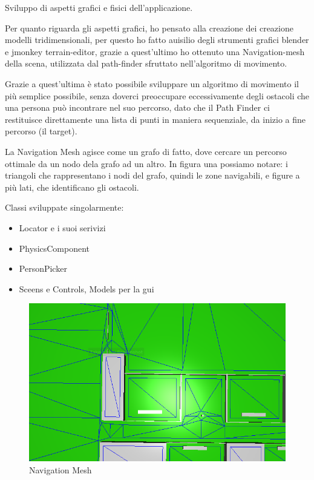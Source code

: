 Sviluppo di aspetti grafici e fisici dell'applicazione.

Per quanto riguarda gli aspetti grafici, ho pensato alla creazione dei creazione modelli tridimensionali, per questo ho fatto auisilio degli strumenti grafici blender e jmonkey terrain-editor, grazie a quest'ultimo ho ottenuto una Navigation-mesh della scena, utilizzata dal path-finder sfruttato nell'algoritmo di movimento.

Grazie a quest'ultima è stato possibile sviluppare un algoritmo di movimento il più semplice possibile, senza doverci preoccupare eccessivamente degli ostacoli che una persona può incontrare nel suo percorso,
dato che il Path Finder ci restituisce direttamente una lista di punti in maniera sequenziale, da inizio a fine percorso (il target).

La Navigation Mesh agisce come un grafo di fatto, dove cercare un percorso ottimale da un nodo dela grafo ad un altro.
In figura una possiamo notare: i triangoli che rappresentano i nodi del grafo, quindi le zone navigabili, e figure a più lati, che identificano gli ostacoli.

Classi sviluppate singolarmente:
\begin{itemize}
\item Locator e i suoi serivizi
\item PhysicsComponent
\item PersonPicker
\item Sceens e Controls, Models per la gui
\end{itemize}

\begin{figure}[h]
\centering{}
\includegraphics{./navmesh_obstacle.png}
\caption{Navigation Mesh}
\label{img:Navigation Mesh}
\end{figure}

